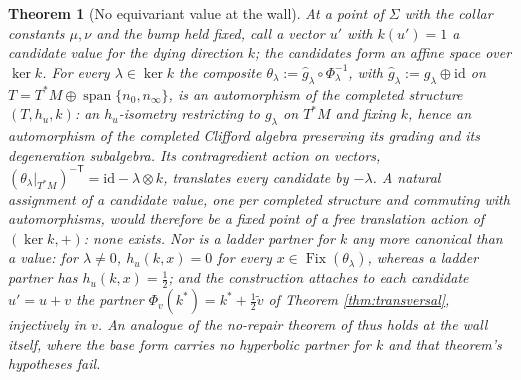 \documentclass[11pt]{article}
\newtheorem{theorem}{Theorem}[section]
\theoremstyle{definition}
\newcommand{\id}{\mathrm{id}}
\newcommand{\Sig}{\Sigma}
\newcommand{\nO}{n_0}
\newcommand{\nInf}{n_\infty}
\begin{document}
\begin{theorem}[No equivariant value at the wall]\label{thm:novalue}
At a point of $\Sig$ with the collar constants $\mu, \nu$ and the bump held fixed, call a vector $u'$ with $k(u') = 1$ a \emph{candidate value} for the dying direction $k$; the candidates form an affine space over $\ker k$. For every $\lambda \in \ker k$ the composite $\theta_\lambda := \hat g_\lambda \circ \Phi_\lambda^{-1}$, with $\hat g_\lambda := g_\lambda \oplus \id$ on $T = T^*M \oplus \operatorname{span}\{\nO, \nInf\}$, is an automorphism of the completed structure $(T, h_u, k)$: an $h_u$-isometry restricting to $g_\lambda$ on $T^*M$ and fixing $k$, hence an automorphism of the completed Clifford algebra preserving its grading and its degeneration subalgebra. Its contragredient action on vectors, $(\theta_\lambda|_{T^*M})^{-\mathsf{T}} = \id - \lambda \otimes k$, translates every candidate by $-\lambda$. A natural assignment of a candidate value, one per completed structure and commuting with automorphisms, would therefore be a fixed point of a free translation action of $(\ker k, +)$: none exists. Nor is a ladder partner for $k$ any more canonical than a value: for $\lambda \neq 0$, $h_u(k, x) = 0$ for every $x \in \operatorname{Fix}(\theta_\lambda)$, whereas a ladder partner has $h_u(k, x) = \tfrac12$; and the construction attaches to each candidate $u' = u + v$ the partner $\Phi_v(k^*) = k^* + \tfrac12\tilde v$ of Theorem \ref{thm:transversal}, injectively in $v$. An analogue of the no-repair theorem of \cite[Thm.~4.2]{ButlerT1} thus holds at the wall itself, where the base form carries no hyperbolic partner for $k$ and that theorem's hypotheses fail.
\end{theorem}
\end{document}
